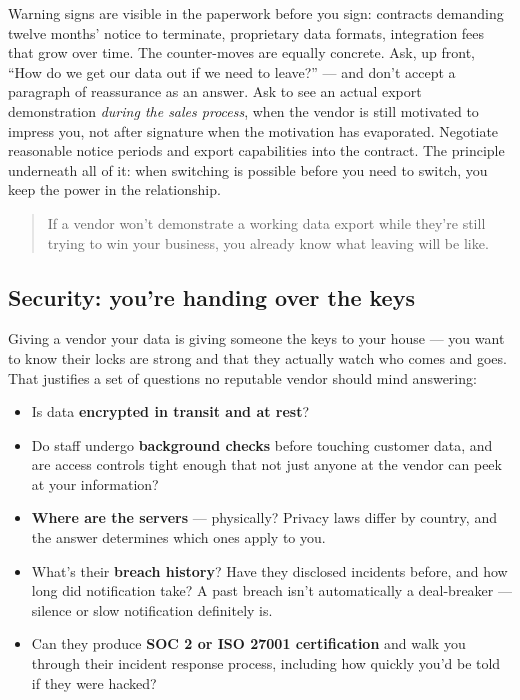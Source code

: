 Warning signs are visible in the paperwork before you sign: contracts demanding twelve months' notice to terminate, proprietary data formats, integration fees that grow over time. The counter-moves are equally concrete. Ask, up front, ``How do we get our data out if we need to leave?'' — and don't accept a paragraph of reassurance as an answer. Ask to see an actual export demonstration \emph{during the sales process}, when the vendor is still motivated to impress you, not after signature when the motivation has evaporated. Negotiate reasonable notice periods and export capabilities into the contract. The principle underneath all of it: when switching is possible before you need to switch, you keep the power in the relationship.



\begin{quote}\small
If a vendor won't demonstrate a working data export while they're still trying to win your business, you already know what leaving will be like.
\end{quote}



\subsection{Security: you're handing over the keys}


Giving a vendor your data is giving someone the keys to your house — you want to know their locks are strong and that they actually watch who comes and goes. That justifies a set of questions no reputable vendor should mind answering:


\begin{itemize}[leftmargin=*]
\item Is data \textbf{encrypted in transit and at rest}?
\item Do staff undergo \textbf{background checks} before touching customer data, and are access controls tight enough that not just anyone at the vendor can peek at your information?
\item \textbf{Where are the servers} — physically? Privacy laws differ by country, and the answer determines which ones apply to you.
\item What's their \textbf{breach history}? Have they disclosed incidents before, and how long did notification take? A past breach isn't automatically a deal-breaker — silence or slow notification definitely is.
\item Can they produce \textbf{SOC 2 or ISO 27001 certification} and walk you through their incident response process, including how quickly you'd be told if they were hacked?
\end{itemize}

